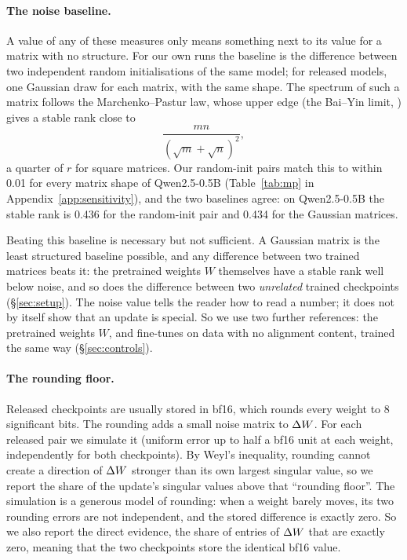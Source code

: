 \paragraph{The noise baseline.} A value of any of these measures only means
something next to its value for a matrix with no structure. For our own runs
the baseline is the difference between two independent random initialisations
of the same model; for released models, one Gaussian draw for each matrix,
with the same shape. The spectrum of such a matrix follows the
Marchenko--Pastur law, whose upper edge (the Bai--Yin limit,
\citealp{bai2010spectral}) gives a stable rank close to
\[
  \frac{mn}{(\sqrt{m}+\sqrt{n})^2},
\]
a quarter of $r$ for square matrices. Our
random-init pairs match this to within 0.01 for every matrix shape of
Qwen2.5-0.5B (Table~\ref{tab:mp} in Appendix~\ref{app:sensitivity}), and the
two baselines agree: on Qwen2.5-0.5B the stable rank is 0.436 for the
random-init pair and 0.434 for the Gaussian matrices.

Beating this baseline is necessary but not sufficient. A Gaussian matrix is
the least structured baseline possible, and any difference between two
trained matrices beats it: the pretrained weights $W$ themselves have a
stable rank well below noise, and so does the difference between two
\emph{unrelated} trained checkpoints (\S\ref{sec:setup}). The noise value
tells the reader how to read a number; it does not by itself show that an
update is special. So we use two further references: the pretrained weights
$W$, and fine-tunes on data with no alignment content, trained the same way
(\S\ref{sec:controls}).

\paragraph{The rounding floor.} Released checkpoints are usually stored in
bf16, which rounds every weight to 8 significant bits. The rounding adds a
small noise matrix to $\Delta W$. For each released pair we simulate it (uniform
error up to half a bf16 unit at each weight, independently for both
checkpoints). By Weyl's inequality, rounding cannot create a direction of
$\Delta W$ stronger than its own largest singular value, so we report the share of
the update's singular values above that ``rounding floor''. The simulation is
a generous model of rounding: when a weight barely moves, its two rounding
errors are not independent, and the stored difference is exactly zero. So we
also report the direct evidence, the share of entries of $\Delta W$ that are
exactly zero, meaning that the two checkpoints store the identical bf16
value.

